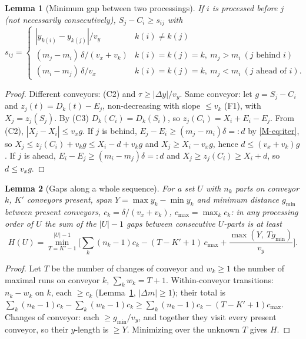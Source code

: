 \documentclass[11pt,a4paper]{article}
\theoremstyle{plain}
\newtheorem{lemma}{Lemma}
\theoremstyle{definition}
\theoremstyle{remark}
\begin{document}
\begin{lemma}[Minimum gap between two processings]\label{lem:L2}
If $i$ is processed before $j$ (not necessarily consecutively), $S_j-C_i\ge s_{ij}$ with
\[
s_{ij}=\begin{cases}
|y_{k(i)}-y_{k(j)}|/v_y & k(i)\ne k(j)\\[0.3ex]
(m_j-m_i)\,\delta/(v_x+v_k) & k(i)=k(j)=k,\ m_j>m_i\ (j\text{ behind } i)\\[0.3ex]
(m_i-m_j)\,\delta/v_x & k(i)=k(j)=k,\ m_j<m_i\ (j\text{ ahead of } i).
\end{cases}
\]
\end{lemma}
\begin{proof}
Different conveyors: (C2) and $\tau\ge|\Delta y|/v_y$. Same conveyor: let $g=S_j-C_i$ and
$z_j(t)=D_k(t)-E_j$, non-decreasing with slope $\le v_k$ (F1), with $X_j=z_j(S_j)$. By
(C3) $D_k(C_i)=D_k(S_i)$, so $z_j(C_i)=X_i+E_i-E_j$. From (C2), $|X_j-X_i|\le v_xg$. If $j$
is behind, $E_j-E_i\ge(m_j-m_i)\delta=:d$ by \eqref{M-eq:iter}, so
$X_j\le z_j(C_i)+v_kg\le X_i-d+v_kg$ and $X_j\ge X_i-v_xg$, hence $d\le(v_x+v_k)g$. If $j$
is ahead, $E_i-E_j\ge(m_i-m_j)\delta=:d$ and $X_j\ge z_j(C_i)\ge X_i+d$, so $d\le v_xg$.
\end{proof}

\begin{lemma}[Gaps along a whole sequence]\label{lem:H}
For a set $U$ with $n_k$ parts on conveyor $k$, $K'$ conveyors present, span
$Y=\max y_k-\min y_k$ and minimum distance $g_{\min}$ between present conveyors,
$c_k=\delta/(v_x+v_k)$, $c_{\max}=\max_kc_k$: in any processing order of $U$ the sum of
the $|U|-1$ gaps between consecutive $U$-parts is at least
\[
H(U)=\min_{T=K'-1}^{|U|-1}\Big[\sum_k(n_k-1)c_k-(T-K'+1)\,c_{\max}+\frac{\max(Y,\ Tg_{\min})}{v_y}\Big].
\]
\end{lemma}
\begin{proof}
Let $T$ be the number of changes of conveyor and $w_k\ge1$ the number of maximal runs on
conveyor $k$, $\sum_kw_k=T+1$. Within-conveyor transitions: $n_k-w_k$ on $k$, each
$\ge c_k$ (Lemma~\ref{lem:L2}, $|\Delta m|\ge1$); their total is
$\sum_k(n_k-1)c_k-\sum_k(w_k-1)c_k\ge\sum_k(n_k-1)c_k-(T-K'+1)c_{\max}$. Changes of
conveyor: each $\ge g_{\min}/v_y$, and together they visit every present conveyor, so their
$y$-length is $\ge Y$. Minimizing over the unknown $T$ gives $H$.
\end{proof}
\end{document}
